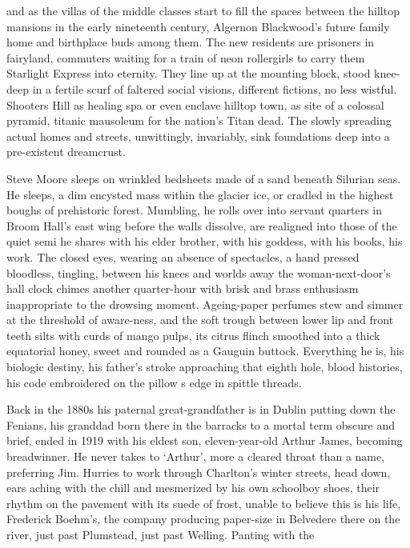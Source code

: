 \documentclass[
]{article}
\begin{document}
and as the villas of the middle classes start to fill the spaces between
the hilltop mansions in the early nineteenth century, Algernon
Blackwood's future family home and birthplace buds among them. The new
residents are prisoners in fairyland, commuters waiting for a train of
neon rollergirls to carry them Starlight Express into eternity. They
line up at the mounting block, stood knee-deep in a fertile scurf of
faltered social visions, different fictions, no less wistful. Shooters
Hill as healing spa or even enclave hilltop town, as site of a colossal
pyramid, titanic mausoleum for the nation's Titan dead. The slowly
spreading actual homes and streets, unwittingly, invariably, sink
foundations deep into a pre-existent dreamcrust. \par
Steve Moore sleeps on wrinkled bedsheets made of a sand beneath
Silurian seas. He sleeps, a dim encysted mass within the glacier ice, or
cradled in the highest boughs of prehistoric forest. Mumbling, he rolls
over into servant quarters in Broom Hall's east wing before the walls
dissolve, are realigned into those of the quiet semi he shares with his
elder brother, with his goddess, with his books, his work. The closed
eyes, wearing an absence of spectacles, a hand pressed bloodless,
tingling, between his knees and worlds away the woman-next-door's hall
clock chimes another quarter-hour with brisk and brass enthusiasm
inappropriate to the drowsing moment. Ageing-paper perfumes stew and
simmer at the threshold of aware-ness, and the soft trough between lower
lip and front teeth silts with curds of mango pulps, its citrus flinch
smoothed into a thick equatorial honey, sweet and rounded as a Gauguin
buttock. Everything he is, his biologic destiny, his father's stroke
approaching that eighth hole, blood histories, his code embroidered on
the pillow s edge in spittle threads. \par
Back in the 1880s his paternal great-grandfather is in Dublin
putting down the Fenians, his granddad born there in the barracks to a
mortal term obscure and brief, ended in 1919 with his eldest son,
eleven-year-old Arthur James, becoming breadwinner. He never takes to
`Arthur', more a cleared throat than a name, preferring Jim. Hurries to
work through Charlton's winter streets, head down, ears aching with the
chill and mesmerized by his own schoolboy shoes, their rhythm on the
pavement with its suede of frost, unable to believe this is his life,
Frederick Boehm's, the company producing paper-size in Belvedere there
on the river, just past Plumstead, just past Welling. Panting with the
\end{document}
